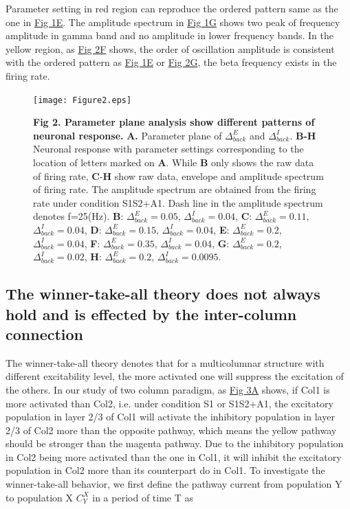 \documentclass[10pt,letterpaper]{article}
\begin{document}
Parameter setting in red region can reproduce the ordered pattern same as the one in \hyperlink{fig:fig1}{Fig 1E}. The amplitude spectrum in \hyperlink{fig:fig2}{Fig 1G} shows two peak of frequency amplitude in gamma band and no amplitude in lower frequency bands.
In the yellow region, as \hyperlink{fig:fig2}{Fig 2F} shows, the order of oscillation amplitude is consistent with the ordered pattern as \hyperlink{fig:fig1}{Fig 1E} or \hyperlink{fig:fig2}{Fig 2G}, the beta frequency exists in the firing rate.

\begin{figure}[!h]
\begin{adjustwidth}{-2in}{0.3in} %
\centering
\texttt{[image: Figure2.eps]}
\begin{flushleft} {\bf Fig 2. Parameter plane analysis show different patterns of neuronal response.}
\textbf{A.} Parameter plane of $\Delta_{back}^{E}$ and $\Delta_{back}^{I}$. \textbf{B-H} Neuronal response with parameter settings corresponding to the location of letters marked on \textbf{A}. While \textbf{B} only shows the raw data of firing rate, \textbf{C}-\textbf{H} show raw data, envelope and amplitude spectrum of firing rate. The amplitude spectrum are obtained from the firing rate under condition S1S2+A1. Dash line in the amplitude spectrum denotes f=25(Hz). \textbf{B}: $\Delta_{back}^{E}=0.05$, $\Delta_{back}^{I}=0.04$, \textbf{C}: $\Delta_{back}^{E}=0.11$, $\Delta_{back}^{I}=0.04$, \textbf{D}: $\Delta_{back}^{E}=0.15$, $\Delta_{back}^{I}=0.04$, \textbf{E}: $\Delta_{back}^{E}=0.2$, $\Delta_{back}^{I}=0.04$, \textbf{F}: $\Delta_{back}^{E}=0.35$, $\Delta_{back}^{I}=0.04$, \textbf{G}: $\Delta_{back}^{E}=0.2$, $\Delta_{back}^{I}=0.02$, \textbf{H}: $\Delta_{back}^{E}=0.2$, $\Delta_{back}^{I}=0.0095$. 
\end{flushleft}
\hypertarget{fig:fig2}{}
\end{adjustwidth}
\end{figure}

\subsection*{The winner-take-all theory does not always hold and is effected by the inter-column connection}
The winner-take-all theory denotes that for a multicolumnar structure with different excitability level, the more activated one will suppress the excitation of the others. In our study of two column paradigm, as \hyperlink{fig:fig3}{Fig 3A} shows, if Col1 is more activated than Col2, i.e. under condition S1 or S1S2+A1, the excitatory population in layer 2/3 of Col1 will activate the inhibitory population in layer 2/3 of Col2 more than the opposite pathway, which means the yellow pathway should be stronger than the magenta pathway. Due to the inhibitory population in Col2 being more activated than the one in Col1, it will inhibit the excitatory population in Col2 more than its counterpart do in Col1.
To investigate the winner-take-all behavior, we first define the pathway current from population Y to population X $C_{Y}^{X}$ in a period of time T as
\end{document}
